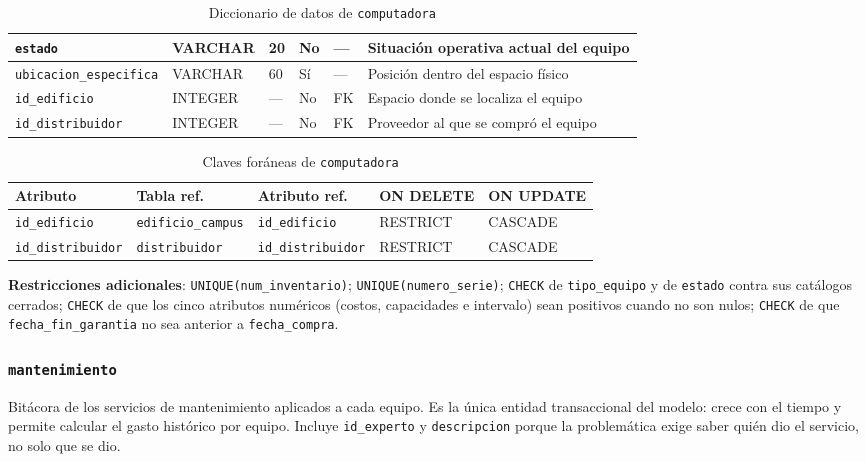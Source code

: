 \documentclass[10pt,a4paper]{article}
\begin{document}
\begin{table}[H]
\begin{tabular}{p{4.7cm} | p{1.6cm} | p{0.8cm} | p{0.7cm} | p{1cm} | p{5.4cm}}
		\texttt{estado} & VARCHAR & 20 & No & --- & Situación operativa actual del equipo \\ \hline
		\texttt{ubicacion\_especifica} & VARCHAR & 60 & Sí & --- & Posición dentro del espacio físico \\ \hline
		\texttt{id\_edificio} & INTEGER & --- & No & FK & Espacio donde se localiza el equipo \\ \hline
		\texttt{id\_distribuidor} & INTEGER & --- & No & FK & Proveedor al que se compró el equipo \\ \hline \hline
	\end{tabular}
	\caption{Diccionario de datos de \texttt{computadora}}
	\label{tabla:dic-computadora}
\end{table}

\begin{table}[H]
	\centering
	\footnotesize
	\begin{tabular}{p{3.6cm} | p{3.4cm} | p{3.4cm} | p{1.5cm} | p{1.5cm}}\hline \hline
		\textbf{Atributo} & \textbf{Tabla ref.} & \textbf{Atributo ref.} & \textbf{ON DELETE} & \textbf{ON UPDATE} \\ \hline \hline
		\texttt{id\_edificio} & \texttt{edificio\_campus} & \texttt{id\_edificio} & RESTRICT & CASCADE \\ \hline
		\texttt{id\_distribuidor} & \texttt{distribuidor} & \texttt{id\_distribuidor} & RESTRICT & CASCADE \\ \hline \hline
	\end{tabular}
	\caption{Claves foráneas de \texttt{computadora}}
	\label{tabla:fk-computadora}
\end{table}

\textbf{Restricciones adicionales}: \texttt{UNIQUE(num\_inventario)}; \texttt{UNIQUE(numero\_serie)}; \texttt{CHECK} de \texttt{tipo\_equipo} y de \texttt{estado} contra sus catálogos cerrados; \texttt{CHECK} de que los cinco atributos numéricos (costos, capacidades e intervalo) sean positivos cuando no son nulos; \texttt{CHECK} de que \texttt{fecha\_fin\_garantia} no sea anterior a \texttt{fecha\_compra}.

\subsubsection{\texttt{mantenimiento}}

Bitácora de los servicios de mantenimiento aplicados a cada equipo. Es la única entidad transaccional del modelo: crece con el tiempo y permite calcular el gasto histórico por equipo. Incluye \texttt{id\_experto} y \texttt{descripcion} porque la problemática exige saber quién dio el servicio, no solo que se dio.
\end{document}
